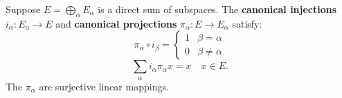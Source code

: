 Suppose $E = \bigoplus_\alpha E_\alpha$ is a direct sum of subspaces. The \textbf{canonical injections} $i_\alpha: E_\alpha \to E$ and \textbf{canonical projections} $\pi_\alpha: E \to E_\alpha$ satisfy:
$$\pi_\alpha \circ i_\beta = \begin{cases} 1 & \beta = \alpha \\ 0 & \beta \neq \alpha \end{cases}$$
$$\sum_\alpha i_\alpha \pi_\alpha x = x \quad x \in E.$$
The $\pi_\alpha$ are surjective linear mappings.
